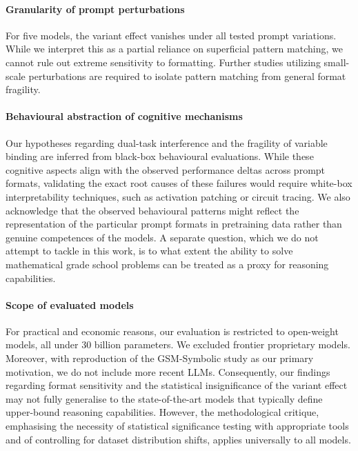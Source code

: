 \documentclass[11pt]{article}
\begin{document}
\paragraph{Granularity of prompt perturbations} For five models, the variant effect vanishes under all tested prompt variations. While we interpret this as a partial reliance on superficial pattern matching, we cannot rule out extreme sensitivity to formatting. Further studies utilizing small-scale perturbations are required to isolate pattern matching from general format fragility.

\paragraph{Behavioural abstraction of cognitive mechanisms} Our hypotheses regarding dual-task interference and the fragility of variable binding are inferred from black-box behavioural evaluations. While these cognitive aspects align with the observed performance deltas across prompt formats, validating the exact root causes of these failures would require white-box interpretability techniques, such as activation patching or circuit tracing. We also acknowledge that the observed behavioural patterns might reflect the representation of the particular prompt formats in pretraining data rather than genuine competences of the models. A separate question, which we do not attempt to tackle in this work, is to what extent the ability to solve mathematical grade school problems can be treated as a proxy for reasoning capabilities.

\paragraph{Scope of evaluated models} For practical and economic reasons, our evaluation is restricted to open-weight models, all under 30 billion parameters. We excluded frontier proprietary models. Moreover, with reproduction of the GSM-Symbolic study as our primary motivation, we do not include more recent LLMs. Consequently, our findings regarding format sensitivity and the statistical insignificance of the variant effect may not fully generalise to the state-of-the-art models that typically define upper-bound reasoning capabilities. However, the methodological critique, emphasising the necessity of statistical significance testing with appropriate tools and of controlling for dataset distribution shifts, applies universally to all models.

\end{document}
